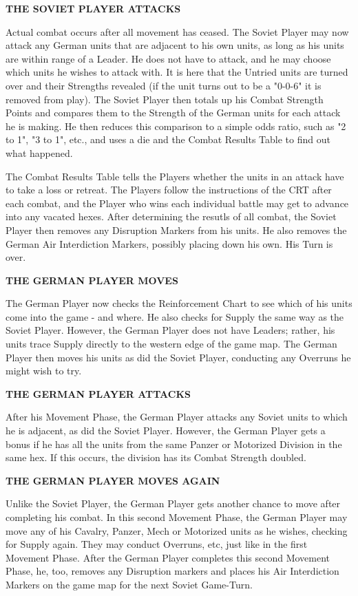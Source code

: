 \textbf{THE SOVIET PLAYER ATTACKS}

Actual combat occurs after all movement has ceased. The Soviet Player may now attack any German units that are adjacent to his own units, as long as his units are within range of a Leader. He does not have to attack, and he may choose which units he wishes to attack with. It is here that the Untried units are turned over and their Strengths revealed (if the unit turns out to be a "0-0-6" it is removed from play). The Soviet Player then totals up his Combat Strength Points and compares them to the Strength of the German units for each attack he is making. He then reduces this comparison to a simple odds ratio, such as "2 to 1", "3 to 1", etc., and uses a die and the Combat Results Table to find out what happened.

The Combat Results Table tells the Players whether the units in an attack have to take a loss or retreat. The Players follow the instructions of the CRT after each combat, and the Player who wins each individual battle may get to advance into any vacated hexes. After determining the resutls of all combat, the Soviet Player then removes any Disruption Markers from his units. He also removes the German Air Interdiction Markers, possibly placing down his own. His Turn is over.

\textbf{THE GERMAN PLAYER MOVES}

The German Player now checks the Reinforcement Chart to see which of his units come into the game - and where. He also checks for Supply the same way as the Soviet Player. However, the German Player does not have Leaders; rather, his units trace Supply directly to the western edge of the game map. The German Player then moves his units as did the Soviet Player, conducting any Overruns he might wish to try.

\textbf{THE GERMAN PLAYER ATTACKS}

After his Movement Phase, the German Player attacks any Soviet units to which he is adjacent, as did the Soviet Player. However, the German Player gets a bonus if he has all the units from the same Panzer or Motorized Division in the same hex. If this occurs, the division has its Combat Strength doubled.

\begin{flushleft}
  \textbf{THE GERMAN PLAYER MOVES AGAIN}
\end{flushleft}

Unlike the Soviet Player, the German Player gets another chance to move after completing his combat. In this second Movement Phase, the German Player may move any of his Cavalry, Panzer, Mech or Motorized units as he wishes, checking for Supply again. They may conduct Overruns, etc, just like in the first Movement Phase. After the German Player completes this second Movement Phase, he, too, removes any Disruption markers and places his Air Interdiction Markers on the game map for the next Soviet Game-Turn.

